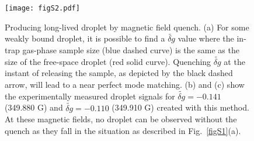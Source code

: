 \begin{figure}[hbtp]
\begin{center}
\texttt{[image: figS2.pdf]}
\end{center}
\caption[Producing long-lived droplet by magnetic field quench]{Producing long-lived droplet by magnetic field quench. (a) For some weakly bound droplet, it is possible to find a $\widetilde{\delta g}$ 
value where the in-trap gas-phase sample size (blue dashed curve) is the same as the size of the free-space droplet (red solid curve). Quenching $\widetilde{\delta g}$ at the instant of releasing the sample, as depicted by the black dashed arrow, will lead to a near perfect mode matching. (b) and (c) show the experimentally measured droplet signals for $\widetilde{\delta g} = -0.141$ (349.880 G) and $\widetilde{\delta g} = -0.110$ (349.910 G) created with this method. At these magnetic fields, no 
droplet can be observed without the quench as they fall in the situation as described in Fig.~\ref{figS1}(a).}
\label{figS2}
\end{figure}

